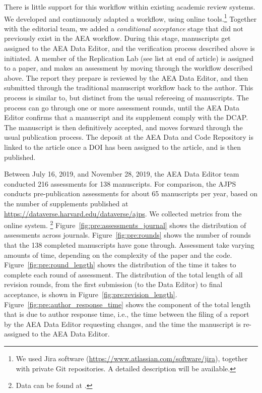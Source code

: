 \documentclass[PP]{AEA}
\newcommand{\aeadcr}{AEA Data and Code Repository}
\newcommand{\furlcite}[2]{#2 (\url{#1})}
\begin{document}
There is little support for this workflow within existing academic review systems. We developed and continuously adapted a workflow, using online tools.\footnote{We used \furlcite{https://www.atlassian.com/software/jira}{Jira software}, together with private Git repositories. A detailed description will be available.} Together with the editorial team, we added a \textit{conditional acceptance} stage that did not previously exist in the AEA workflow. During this stage, manuscripts get assigned to the AEA Data Editor, and the verification process described above is initiated. A member of the Replication Lab (see list at end of article) is assigned to a paper, and makes an assessment by moving through the workflow described above. The report they prepare is reviewed by the AEA Data Editor, and then submitted through the traditional manuscript workflow back to the author. This process is similar to, but distinct from the usual refereeing of manuscripts. The process can go through one or more assessment rounds, until the AEA Data Editor confirms that a manuscript and its supplement comply with the \ac{DCAP}. The manuscript is then definitively accepted, and moves forward through the usual publication process. The deposit at the \aeadcr{} is linked to the article once a \ac{DOI} has been assigned to the article, and is then published.

\newcommand{\jiratickets}{216}
\newcommand{\jiramcs}{138}

Between July 16, 2019, and November 28, 2019, the AEA Data Editor team conducted 
\jiratickets{} assessments for \jiramcs{} manuscripts.
For comparison, the \ac{AJPS} conducts pre-publication assessments for about 65 manuscripts per year, based on the number of supplements published at \url{https://dataverse.harvard.edu/dataverse/ajps}.
%
We collected metrics from the online system.%
\footnote{Data  can be found at \citet{E117876V1}.}
Figure~\ref{fig:pre:assessments_journal} shows the distribution of  assessments across journals. Figure~\ref{fig:pre:rounds} shows the number of rounds that the \jiramcs{} completed manuscripts have gone through. Assessment take varying amounts of time, depending on the complexity of the paper and the code. Figure~\ref{fig:pre:round_length} shows the distribution of the time it takes to complete each round of assessment. The distribution of the total length of all revision rounds, from the first submission (to the Data Editor) to final acceptance, is shown in Figure~\ref{fig:pre:revision_length}. Figure~\ref{fig:pre:author_response_time} shows the component of the total length that is due to author response time, i.e., the time between the filing of a report by the AEA Data Editor requesting changes, and the time the manuscript is re-assigned to the AEA Data Editor. 
\end{document}
